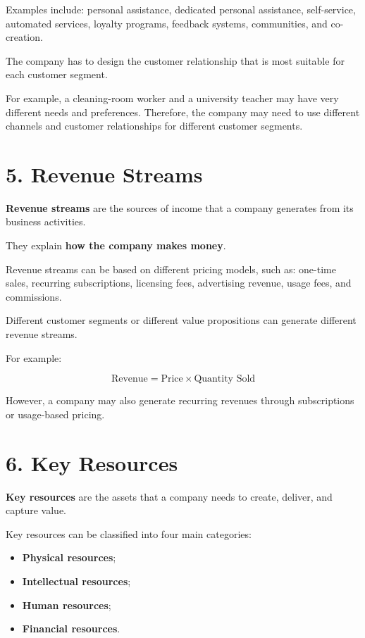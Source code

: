 \documentclass[12pt,a4paper]{report}
\begin{document}
Examples include: personal assistance, dedicated personal assistance, self-service, automated services, loyalty programs, feedback systems, communities, and co-creation.

The company has to design the customer relationship that is most suitable for each customer segment.

For example, a cleaning-room worker and a university teacher may have very different needs and preferences. Therefore, the company may need to use different channels and customer relationships for different customer segments.

\section{5. Revenue Streams}

\textbf{Revenue streams} are the sources of income that a company generates from its business activities.

They explain \textbf{how the company makes money}.

Revenue streams can be based on different pricing models, such as:  one-time sales, recurring subscriptions, licensing fees, advertising revenue, usage fees, and commissions.


Different customer segments or different value propositions can generate different revenue streams.

For example:

\[
\text{Revenue} = \text{Price} \times \text{Quantity Sold}
\]

However, a company may also generate recurring revenues through subscriptions or usage-based pricing.

\section{6. Key Resources}

\textbf{Key resources} are the assets that a company needs to create, deliver, and capture value.

Key resources can be classified into four main categories:

\begin{itemize}
    \item \textbf{Physical resources};
    \item \textbf{Intellectual resources};
    \item \textbf{Human resources};
    \item \textbf{Financial resources}.
\end{itemize}
\end{document}
